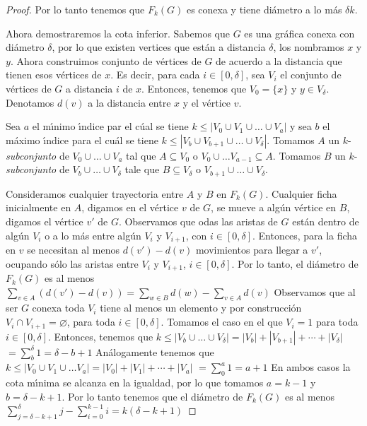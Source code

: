 \begin{proof}
Por lo tanto tenemos que $F_{k}(G)$ es conexa y tiene di\'ametro a lo m\'as 
$\delta k$.

Ahora demostraremos la cota inferior. Sabemos que $G$ es una gr\'afica conexa 
con di\'ametro $\delta$, por lo que existen vertices que est\'an a distancia 
$\delta$, los nombramos $x$ y $y$. Ahora construimos conjunto de v\'ertices de 
$G$ de acuerdo a la distancia que tienen esos v\'ertices de $x$. Es decir, para
cada $i\in [0,\delta]$, sea $V_{i}$ el conjunto de v\'ertices de $G$ a 
distancia $i$ de $x$. Entonces, tenemos que $V_{0}=\{x\}$ y $y\in V_{\delta}$.
Denotamos $d(v)$ a la distancia entre $x$ y el v\'ertice $v$.

Sea $a$ el m\'\i{}nimo \'\i{}ndice par el c\'ual se tiene $k \leq |V_{0}\cup
V_{1}\cup \dots \cup V_{a}|$ y sea $b$ el m\'aximo \'\i{}ndice para el cu\'al se
tiene $k\leq |V_{b}\cup V_{b+1}\cup \dots \cup V_{\delta}|$. Tomamos $A$ un
$k$-\textit{subconjunto} de $V_{0}\cup \dots \cup V_{a}$  tal que $A\subseteq
V_{0}$ o $V_{0}\cup \dots V_{a-1}\subseteq A$. Tomamos $B$ un
$k$-\textit{subconjunto} de $V_{b}\cup \dots \cup V_{\delta}$ tale que
$B\subseteq V_{\delta}$ o $V_{b+1}\cup \dots \cup V_{\delta}$. 

Consideramos cualquier trayectoria entre $A$ y $B$ en $F_{k}(G)$. Cualquier
ficha inicialmente en $A$, digamos en el v\'ertice $v$ de $G$, se mueve a
alg\'un v\'ertice en $B$, digamos el v\'ertice $v'$ de $G$. Observamos que odas
las aristas de $G$ est\'an dentro de alg\'un $V_{i}$ o a lo m\'as entre alg\'un
$V_{i}$ y $V_{i+1}$, con $i\in[0,\delta]$. Entonces, para la ficha en $v$ se
necesitan al menos $d(v')-d(v)$ movimientos para llegar a $v'$, ocupando s\'olo
las aristas entre $V_{i}$ y $V_{i+1}$, $i\in [0,\delta]$. Por lo tanto, el
di\'ametro de $F_{k}(G)$ es al menos $\sum_{v\in A}(d(v')-d(v))= \sum_{w\in
B}d(w)-\sum_{v\in A}d(v)$ Observamos que al ser $G$ conexa toda $V_{i}$ tiene al
menos un elemento y por construcci\'on $V_{i} \cap V_{i+1}=\varnothing$, para
toda $i\in [0,\delta]$. Tomamos el caso en el que $V_{i}=1$ para toda $i\in
[0,\delta]$. Entonces, tenemos que $k\leq |V_{b}\cup\dots\cup
V_{\delta}|=|V_{b}|+|V_{b+1}|+\cdots +|V_\delta|$ $=\sum_{b}^{\delta}1 = \delta
-b+1$ An\'alogamente tenemos que $k\leq |V_{0}\cup V_{1}\cup \dots
V_{a}|=|V_{0}|+|V_{1}|+\cdots + |V_{a}|$ $=\sum_{0}^{a} 1 = a+1$ En ambos casos
la cota m\'\i{}nima se alcanza en la igualdad, por lo que tomamos $a=k-1$ y
$b=\delta-k+1$. Por lo tanto tenemos que el di\'ametro de $F_{k}(G)$ es al menos
$\sum_{j=\delta -k+1}^{\delta}j - \sum_{i=0}^{k-1}i = k(\delta-k+1)$
\end{proof}


